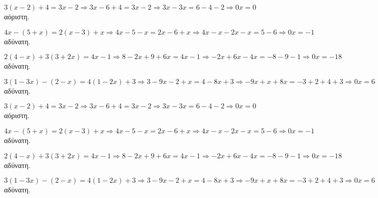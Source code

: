 \begin{rlist}
\item $3(x-2)+4=3x-2\Rightarrow 3x-6+4=3x-2\Rightarrow 3x-3x=6-4-2\Rightarrow 0x=0$ αόριστη.
\item $ 4x-(5+x)=2(x-3)+x\Rightarrow 4x-5-x=2x-6+x\Rightarrow 4x-x-2x-x=5-6\Rightarrow 0x=-1 $ αδύνατη.
\item $ 2(4-x)+3(3+2x)=4x-1\Rightarrow 8-2x+9+6x=4x-1\Rightarrow -2x+6x-4x=-8-9-1\Rightarrow 0x=-18 $ αδύνατη.
\item $ 3(1-3x)-(2-x)=4(1-2x)+3\Rightarrow 3-9x-2+x=4-8x+3\Rightarrow -9x+x+8x=-3+2+4+3\Rightarrow 0x=6 $ αδύνατη.
\end{rlist}
\begin{rlist}
\item $3(x-2)+4=3x-2\Rightarrow 3x-6+4=3x-2\Rightarrow 3x-3x=6-4-2\Rightarrow 0x=0$ αόριστη.
\item $ 4x-(5+x)=2(x-3)+x\Rightarrow 4x-5-x=2x-6+x\Rightarrow 4x-x-2x-x=5-6\Rightarrow 0x=-1 $ αδύνατη.
\item $ 2(4-x)+3(3+2x)=4x-1\Rightarrow 8-2x+9+6x=4x-1\Rightarrow -2x+6x-4x=-8-9-1\Rightarrow 0x=-18 $ αδύνατη.
\item $ 3(1-3x)-(2-x)=4(1-2x)+3\Rightarrow 3-9x-2+x=4-8x+3\Rightarrow -9x+x+8x=-3+2+4+3\Rightarrow 0x=6 $ αδύνατη.
\end{rlist}
